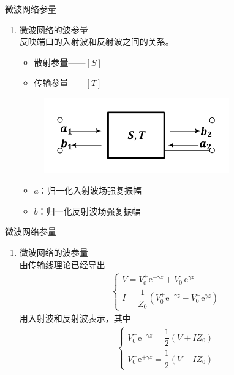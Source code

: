 \begin{frame}{微波网络参量}
    \begin{enumerate}
        \resume
        \item 微波网络的波参量\\
              反映端口的入射波和反射波之间的关系。\\
              \begin{itemize}
                  \item 散射参量——$[S]$
                  \item 传输参量——$[T]$
              \end{itemize}
              \begin{figure}
                  \includegraphics[width=8cm]{Cha5//fig5-10.pdf}
              \end{figure}
              \begin{itemize}
                  \item $a$：归一化入射波场强复振幅
                  \item $b$：归一化反射波场强复振幅
              \end{itemize}
    \end{enumerate}
\end{frame}

\begin{frame}{微波网络参量}
    \begin{enumerate}
        \resume
        \item 微波网络的波参量\\
              由传输线理论已经导出
              \begin{gather*}
                  \begin{cases}
                      V=V_0^+\mathrm{e}^{-\gamma z}+V_0^-\mathrm{e}^{\gamma z} \\
                      I=\dfrac{1}{Z_0}(V_0^+\mathrm{e}^{-\gamma z}-V_0^-\mathrm{e}^{\gamma z})
                  \end{cases}
              \end{gather*}
              用入射波和反射波表示，其中
              \begin{gather*}
                  \begin{cases}
                      V_0^+\mathrm{e}^{-\gamma z}=\dfrac{1}{2}(V+IZ_0) \\
                      V_0^-\mathrm{e}^{+\gamma z}=\dfrac{1}{2}(V-IZ_0)
                  \end{cases}
              \end{gather*}
    \end{enumerate}
\end{frame}

